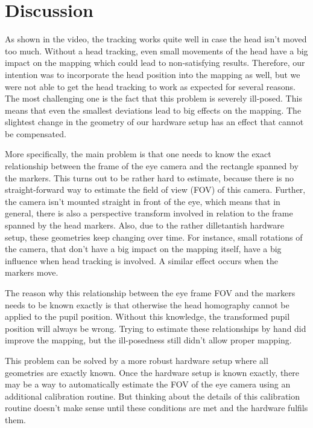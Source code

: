 \section{Discussion}\label{discussion}

As shown in the video, the tracking works quite well in case the head isn't moved too much. 
Without a head tracking, even small movements of the head have a big impact on the mapping which could lead to non-satisfying results.
Therefore, our intention was to incorporate the head position into the mapping as well, but we were not able to get the head tracking to work as expected for several reasons. 
The most challenging one is the fact that this problem is severely ill-posed. This means that even the smallest deviations lead to big effects on the mapping. The slightest change in the geometry of our hardware setup has an effect that cannot be compensated.

More specifically, the main problem is that one needs to know the exact relationship between the frame of the eye camera and the rectangle spanned by the markers. 
This turns out to be rather hard to estimate, because there is no straight-forward way to estimate the field of view (FOV) of this camera. 
Further, the camera isn't mounted straight in front of the eye, which means that in general, there is also a perspective transform involved in relation to the frame spanned by the head markers. 
Also, due to the rather dilletantish hardware setup, these geometries keep changing over time. 
For instance, small rotations of the camera, that don't have a big impact on the mapping itself, have a big influence when head tracking is involved.
A similar effect occurs when the markers move. 

The reason why this relationship between the eye frame FOV and the markers needs to be known exactly is that otherwise the head homography cannot be applied to the pupil position. Without this knowledge, the transformed pupil position will always be wrong. Trying to estimate these relationships by hand did improve the mapping, but the ill-posedness still didn't allow proper mapping. 

This problem can be solved by a more robust hardware setup where all geometries are exactly known. 
Once the hardware setup is known exactly, there may be a way to automatically estimate the FOV of the eye camera using an additional calibration routine. 
But thinking about the details of this calibration routine doesn't make sense until these conditions are met and the hardware fulfils them.

